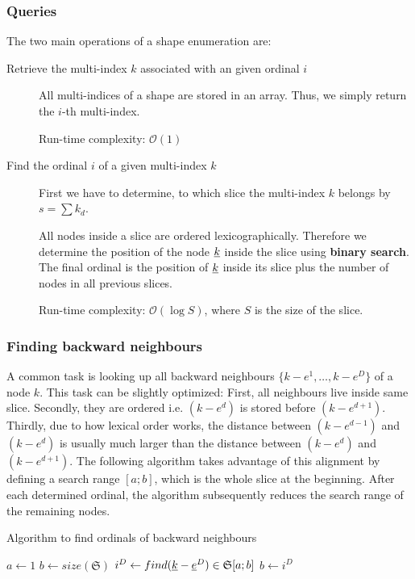 \documentclass{article}
\begin{document}
\subsubsection{Queries}
The two main operations of a shape enumeration are:
\begin{description}
\item[Retrieve the multi-index \(k\) associated with an given ordinal \(i\)]\mbox{}
  \par
  All multi-indices of a shape are stored in an array.
  Thus, we simply return the \(i\)-th multi-index.
  \par
  Run-time complexity: \(\mathcal{O}(1)\)
\item[Find the ordinal \(i\) of a given multi-index \(k\)]\mbox{}
  \par
  First we have to determine, to which slice the multi-index \(k\) belongs by
  \(s = \sum k_d \).\par
  All nodes inside a slice are ordered lexicographically. Therefore
  we determine the position of the node \(\underline{k}\) inside the slice using \textbf{binary search}.
  The final ordinal is the position of \(\underline{k}\) inside its slice plus
  the number of nodes in all previous slices.
  \par
  Run-time complexity: \(\mathcal{O}(\log{}S)\), where \(S\) is the size of the slice.
  
\end{description}

\subsubsection{Finding backward neighbours}
A common task is looking up all backward neighbours \(\{k-e^1,\ldots,k-e^D\}\)
of a node \(k\). This task can be slightly optimized: First, all neighbours live inside same slice.
Secondly, they
are ordered i.e. \((k-e^d)\) is stored before \((k-e^{d+1})\). Thirdly, due to how lexical order
works, the distance between \((k-e^{d-1})\) and \((k-e^d)\) is usually much larger than the distance
between \((k-e^d)\) and \((k-e^{d+1})\).
The following algorithm takes advantage of this alignment by defining a search range \([a;b]\),
which is the whole slice at the beginning.
After each determined ordinal, the algorithm subsequently reduces the search range
of the remaining nodes.

\begin{algorithm}[H]
  \caption{Algorithm to find ordinals of backward neighbours}
  \(a \leftarrow 1\)\;
  \(b \leftarrow size(\mathfrak{S})\)\;
  \(i^D \leftarrow find(\underline{k}-\underline{e}^D) \in \mathfrak{S}[a;b]\)\;
  \(b \leftarrow i^D\)\;
\end{algorithm}
\end{document}
